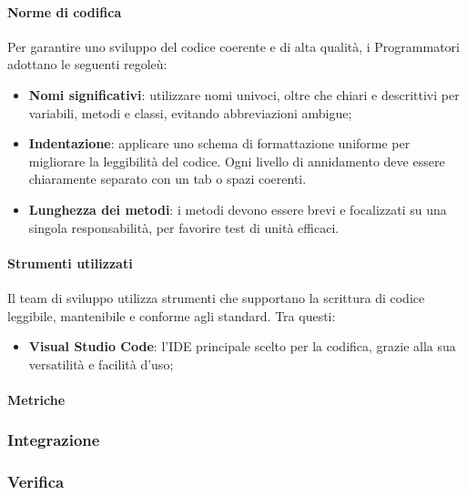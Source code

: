     \paragraph{Norme di codifica}
    Per garantire uno sviluppo del codice coerente e di alta qualità, i Programmatori adottano le seguenti regoleù:
    \begin{itemize}
        \item \textbf{Nomi significativi}: utilizzare nomi univoci, oltre che chiari e descrittivi per variabili, metodi e classi, evitando abbreviazioni ambigue;
        \item \textbf{Indentazione}: applicare uno schema di formattazione uniforme per migliorare la leggibilità del codice. Ogni livello di annidamento deve essere chiaramente separato con un tab o spazi coerenti.
        \item \textbf{Lunghezza dei metodi}: i metodi devono essere brevi e focalizzati su una singola responsabilità, per favorire test di unità efficaci.
    \end{itemize}
    
    \paragraph{Strumenti utilizzati}
    Il team di sviluppo utilizza strumenti che supportano la scrittura di codice leggibile, mantenibile e conforme agli standard. Tra questi:
    \begin{itemize}
        \item \textbf{Visual Studio Code}: l'IDE principale scelto per la codifica, grazie alla sua versatilità e facilità d'uso;
    \end{itemize}
    
    \paragraph{Metriche}
    
    \subsubsection{Integrazione}
    
    \subsubsection{Verifica}


